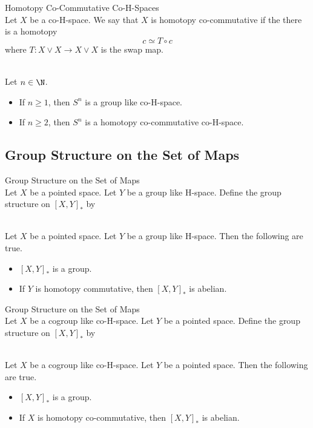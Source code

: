 \documentclass[a4paper]{article}
\begin{document}
\begin{defn}{Homotopy Co-Commutative Co-H-Spaces}{}\\
Let $X$ be a co-H-space. We say that $X$ is homotopy co-commutative if the there is a homotopy $$c\simeq T\circ c$$ where $T:X\vee X\to X\vee X$ is the swap map. 
\end{defn}

\begin{eg}{}{}\\
Let $n\in\N$. 
\begin{itemize}
\item If $n\geq 1$, then $S^n$ is a group like co-H-space. 
\item If $n\geq 2$, then $S^n$ is a homotopy co-commutative co-H-space. 
\end{itemize}
\end{eg}

\subsection{Group Structure on the Set of Maps}
\begin{defn}{Group Structure on the Set of Maps}{}\\
Let $X$ be a pointed space. Let $Y$ be a group like H-space. Define the group structure on $[X,Y]_\ast$ by 
\end{defn}

\begin{prp}{}{}\\
Let $X$ be a pointed space. Let $Y$ be a group like H-space. Then the following are true. 
\begin{itemize}
\item $[X,Y]_\ast$ is a group. 
\item If $Y$ is homotopy commutative, then $[X,Y]_\ast$ is abelian. 
\end{itemize}
\end{prp}

\begin{defn}{Group Structure on the Set of Maps}{}\\
Let $X$ be a cogroup like co-H-space. Let $Y$ be a pointed space. Define the group structure on $[X,Y]_\ast$ by 
\end{defn}

\begin{prp}{}{}\\
Let $X$ be a cogroup like co-H-space. Let $Y$ be a pointed space. Then the following are true. 
\begin{itemize}
\item $[X,Y]_\ast$ is a group. 
\item If $X$ is homotopy co-commutative, then $[X,Y]_\ast$ is abelian. 
\end{itemize}
\end{prp}
\end{document}
